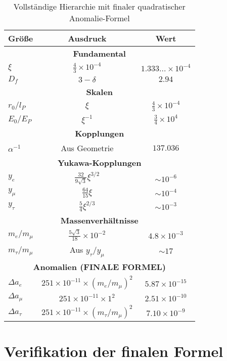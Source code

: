 \documentclass[12pt,a4paper]{article}
\newcommand{\lP}{l_P}
\newcommand{\EP}{E_P}
\newcommand{\rzero}{r_0}
\newcommand{\Ezero}{E_0}
\newcommand{\xipar}{\xi}
\begin{document}
	\begin{table}[h]
		\centering
		\begin{tabular}{lcc}
			\toprule
			\textbf{Größe} & \textbf{Ausdruck} & \textbf{Wert} \\
			\midrule
			\multicolumn{3}{c}{\textbf{Fundamental}} \\
			$\xipar$ & $\frac{4}{3} \times 10^{-4}$ & $1.333\ldots \times 10^{-4}$ \\
			$D_f$ & $3 - \delta$ & $2.94$ \\
			\midrule
			\multicolumn{3}{c}{\textbf{Skalen}} \\
			$\rzero/\lP$ & $\xipar$ & $\frac{4}{3} \times 10^{-4}$ \\
			$\Ezero/\EP$ & $\xipar^{-1}$ & $\frac{3}{4} \times 10^{4}$ \\
			\midrule
			\multicolumn{3}{c}{\textbf{Kopplungen}} \\
			$\alpha^{-1}$ & Aus Geometrie & $137.036$ \\
			\midrule
			\multicolumn{3}{c}{\textbf{Yukawa-Kopplungen}} \\
			$y_e$ & $\frac{32}{9\sqrt{3}} \xipar^{3/2}$ & $\sim 10^{-6}$ \\
			$y_\mu$ & $\frac{64}{15} \xipar$ & $\sim 10^{-4}$ \\
			$y_\tau$ & $\frac{5}{4} \xipar^{2/3}$ & $\sim 10^{-3}$ \\
			\midrule
			\multicolumn{3}{c}{\textbf{Massenverhältnisse}} \\
			$m_e/m_\mu$ & $\frac{5 \sqrt{3}}{18} \times 10^{-2}$ & $4.8 \times 10^{-3}$ \\
			$m_\tau/m_\mu$ & Aus $y_\tau/y_\mu$ & $\sim 17$ \\
			\midrule
			\multicolumn{3}{c}{\textbf{Anomalien (FINALE FORMEL)}} \\
			$\Delta a_e$ & $251 \times 10^{-11} \times (m_e/m_\mu)^2$ & $5.87 \times 10^{-15}$ \\
			$\Delta a_\mu$ & $251 \times 10^{-11} \times 1^2$ & $2.51 \times 10^{-10}$ \\
			$\Delta a_\tau$ & $251 \times 10^{-11} \times (m_\tau/m_\mu)^2$ & $7.10 \times 10^{-9}$ \\
			\bottomrule
		\end{tabular}
		\caption{Vollständige Hierarchie mit finaler quadratischer Anomalie-Formel}
	\end{table}
	
	\section{Verifikation der finalen Formel}
	
\end{document}
